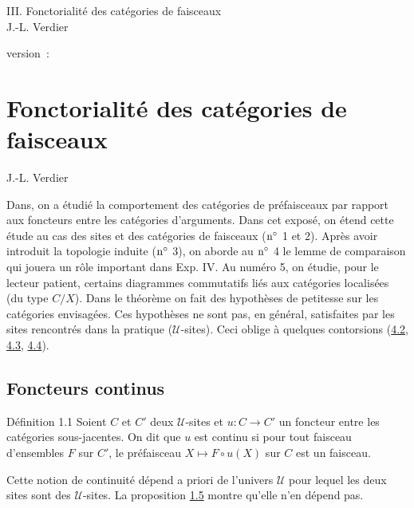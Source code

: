 \documentclass[10pt]{../fichiers-configuration-latex/smfart}
\begin{document}
\begin{center}
III. Fonctorialité des catégories de faisceaux\\
J.-L. Verdier
\end{center}

version : \showgitstatus{}
\tableofcontents

\else
\chapter{Fonctorialité des catégories de faisceaux}
\begin{center}
J.-L. Verdier
\end{center}
\fi

Dans\pageoriginale {}, on a étudié la comportement des catégories de
préfaisceaux par rapport aux foncteurs entre les catégories
d'arguments. Dans cet exposé, on étend cette étude au cas des sites
et des catégories de faisceaux (${\rm n^{\circ}}$ 1 et 2). Après
avoir introduit la topologie induite (${\rm n^{\circ}}$ 3), on
aborde au ${\rm n^{\circ}}$ 4 le lemme de comparaison qui jouera un
rôle important dans Exp. IV. Au numéro 5, on étudie, pour le
lecteur patient, certains diagrammes commutatifs liés aux catégories
localisées (du type $C/X$). Dans le théorème  on fait
des hypothèses de petitesse sur les catégories envisagées. Ces
hypothèses ne sont pas, en général, satisfaites par les sites
rencontrés dans la pratique ($𝒰$-sites). Ceci oblige à
quelques contorsions (\hyperref[III.subsec4.2]{4.2}, \hyperref[III.subsec4.3]{4.3},
\hyperref[III.subsec4.4]{4.4}).

\section{Foncteurs continus}

\begin{enonce*}{Définition 1.1}
Soient $C$ et $C'$ deux $𝒰$-sites et $u:C\rightarrow C'$ un
foncteur entre les catégories sous-jacentes. On dit que $u$ est
continu si pour tout faisceau d'ensembles $F$ sur $C'$, le
préfaisceau $X\mapsto F\circ u(X)$ sur $C$ est un faisceau.
\end{enonce*}

Cette notion de continuité dépend a priori de l'univers
$𝒰$ pour lequel les deux sites sont des $𝒰$-sites.
La proposition \hyperref[III.prop1.5]{1.5} montre qu'elle n'en dépend pas.
\end{document}
